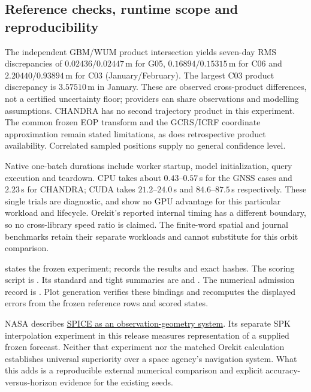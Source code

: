 \subsection{Reference checks, runtime scope and reproducibility}
The independent GBM/WUM product intersection yields seven-day RMS discrepancies
of $0.02436/0.02447$\,m for G05, $0.16894/0.15315$\,m for C06 and
$2.20440/0.93894$\,m for C03 (January/February). The largest C03 product
discrepancy is $3.57510$\,m in January. These are observed cross-product
differences, not a certified uncertainty floor; providers can share observations
and modelling assumptions. CHANDRA has no second trajectory product in this
experiment. The common frozen EOP transform and the GCRS/ICRF coordinate
approximation remain stated limitations, as does retrospective product
availability. Correlated sampled positions supply no general confidence level.

Native one-batch durations include worker startup, model initialization, query
execution and teardown. CPU takes about $0.43$--$0.57$\,s for the GNSS cases
and $2.23$\,s for CHANDRA; CUDA takes $21.2$--$24.0$\,s and
$84.6$--$87.5$\,s respectively. These single trials are diagnostic, and show
no GPU advantage for this particular workload and lifecycle. Orekit's reported
internal timing has a different boundary, so no cross-library speed ratio is
claimed. The finite-word spatial and journal benchmarks retain their separate
workloads and cannot substitute for this orbit comparison.

 states the frozen experiment;
 records the results and exact hashes.
The scoring script is . Its standard and
tight summaries are 
and .
The numerical admission record is .
Plot generation verifies these bindings and recomputes the displayed errors
from the frozen reference rows and scored states.

NASA describes \href{https://naif.jpl.nasa.gov/naif/index.html}{SPICE as an
observation-geometry system}. Its separate SPK interpolation experiment in this
release measures representation of a supplied frozen forecast. Neither that
experiment nor the matched Orekit calculation establishes universal superiority
over a space agency's navigation system. What this adds is a reproducible
external numerical comparison and explicit accuracy-versus-horizon evidence for
the existing seeds.


